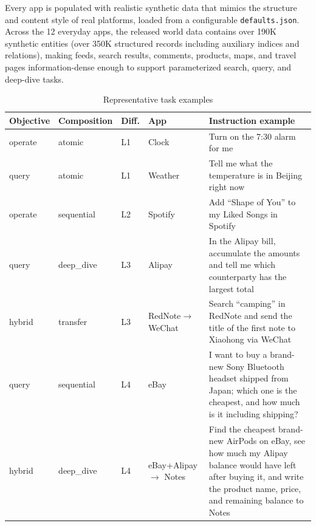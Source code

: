 Every app is populated with realistic synthetic data that mimics the structure and content style of real platforms, loaded from a configurable \texttt{defaults.json}. Across the 12 everyday apps, the released world data contains over 190K synthetic entities (over 350K structured records including auxiliary indices and relations), making feeds, search results, comments, products, maps, and travel pages information-dense enough to support parameterized search, query, and deep-dive tasks.

\begin{table}[!t]
  \centering\small
  \begin{tabular}{p{1.4cm}p{1.7cm}p{0.6cm}p{2.2cm}p{7.2cm}}
    \toprule
    \textbf{Objective} & \textbf{Composition} & \textbf{Diff.} & \textbf{App} & \textbf{Instruction example} \\
    \midrule
    operate & atomic     & L1 & Clock                & Turn on the 7:30 alarm for me \\
    query   & atomic     & L1 & Weather              & Tell me what the temperature is in Beijing right now \\
    operate & sequential & L2 & Spotify              & Add ``Shape of You'' to my Liked Songs in Spotify \\
    query   & deep\_dive & L3 & Alipay               & In the Alipay bill, accumulate the amounts and tell me which counterparty has the largest total \\
    hybrid  & transfer   & L3 & RedNote\newline $\to$ WeChat & Search ``camping'' in RedNote and send the title of the first note to Xiaohong via WeChat \\
    query   & sequential & L4 & eBay                 & I want to buy a brand-new Sony Bluetooth headset shipped from Japan; which one is the cheapest, and how much is it including shipping? \\
    hybrid  & deep\_dive & L4 & eBay+Alipay\newline $\to$ Notes & Find the cheapest brand-new AirPods on eBay, see how much my Alipay balance would have left after buying it, and write the product name, price, and remaining balance to Notes \\
    \bottomrule
  \end{tabular}
  \caption{Representative task examples}
  \label{tab:task-examples}
\end{table}


